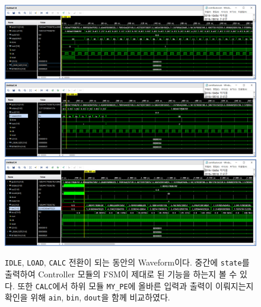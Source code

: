 \documentclass{article}
\begin{document}
\begin{figure}[htb!]
	\centering
	\includegraphics[width=1.0\textwidth]{fig/My_PE_Controller_Waveform1.png}
	\includegraphics[width=1.0\textwidth]{fig/My_PE_Controller_Waveform2.png}
	\includegraphics[width=1.0\textwidth]{fig/My_PE_Controller_Waveform3.png}
\caption{\texttt{IDLE}, \texttt{LOAD}, \texttt{CALC} 전환이 되는 동안의 Waveform이다. 중간에 \texttt{state}를 출력하여 Controller 모듈의 FSM이 제대로 된 기능을 하는지 볼 수 있다. 또한 \texttt{CALC}에서 하위 모듈 \texttt{MY\_PE}에 올바른 입력과 출력이 이뤄지는지 확인을 위해 \texttt{ain}, \texttt{bin}, \texttt{dout}을 함께 비교하였다.}
\label{fig2}
\end{figure}
\end{document}
